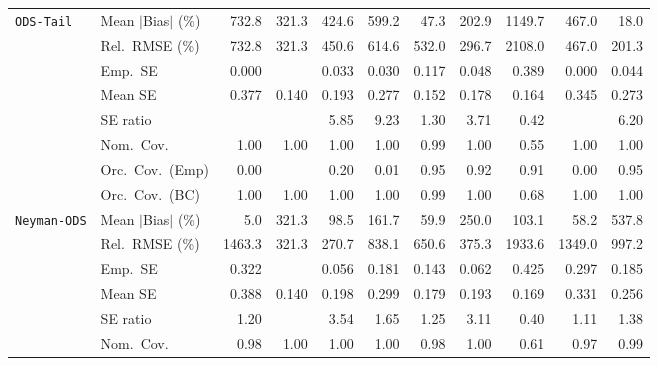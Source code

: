 \begin{landscape}
\begin{longtable}{llrrrrrrrrr}
\addlinespace[2pt]
\quad \texttt{ODS-Tail} & Mean $|$Bias$|$ (\%) & 732.8 & 321.3 & 424.6 & 599.2 & \cellcolor{ranktwo}47.3 & \cellcolor{rankthree}202.9 & 1149.7 & 467.0 & \cellcolor{rankone}18.0 \\
 & Rel.\ RMSE (\%) & 732.8 & \cellcolor{rankthree}321.3 & 450.6 & 614.6 & 532.0 & \cellcolor{ranktwo}296.7 & 2108.0 & 467.0 & \cellcolor{rankone}201.3 \\
 & Emp.\ SE & 0.000 &  & 0.033 & 0.030 & 0.117 & 0.048 & 0.389 & 0.000 & 0.044 \\
 & Mean SE & 0.377 & 0.140 & 0.193 & 0.277 & 0.152 & 0.178 & 0.164 & 0.345 & 0.273 \\
 & SE ratio &  &  & 5.85 & 9.23 & \cellcolor{rankone}1.30 & \cellcolor{rankthree}3.71 & \cellcolor{ranktwo}0.42 &  & 6.20 \\
 & Nom.\ Cov. & \cellcolor{ranktwo}1.00 & \cellcolor{ranktwo}1.00 & \cellcolor{ranktwo}1.00 & \cellcolor{ranktwo}1.00 & \cellcolor{rankone}0.99 & \cellcolor{ranktwo}1.00 & \cellcolor{rankthree}0.55 & \cellcolor{ranktwo}1.00 & \cellcolor{ranktwo}1.00 \\
 & Orc.\ Cov.\ (Emp) & 0.00 &  & 0.20 & 0.01 & \cellcolor{rankone}0.95 & \cellcolor{ranktwo}0.92 & \cellcolor{rankthree}0.91 & 0.00 & \cellcolor{rankone}0.95 \\
 & Orc.\ Cov.\ (BC) & \cellcolor{ranktwo}1.00 & \cellcolor{ranktwo}1.00 & \cellcolor{ranktwo}1.00 & \cellcolor{ranktwo}1.00 & \cellcolor{rankone}0.99 & \cellcolor{ranktwo}1.00 & \cellcolor{rankthree}0.68 & \cellcolor{ranktwo}1.00 & \cellcolor{ranktwo}1.00 \\
\addlinespace[2pt]
\quad \texttt{Neyman-ODS} & Mean $|$Bias$|$ (\%) & \cellcolor{rankone}5.0 & 321.3 & 98.5 & 161.7 & \cellcolor{rankthree}59.9 & 250.0 & 103.1 & \cellcolor{ranktwo}58.2 & 537.8 \\
 & Rel.\ RMSE (\%) & 1463.3 & \cellcolor{ranktwo}321.3 & \cellcolor{rankone}270.7 & 838.1 & 650.6 & \cellcolor{rankthree}375.3 & 1933.6 & 1349.0 & 997.2 \\
 & Emp.\ SE & 0.322 &  & 0.056 & 0.181 & 0.143 & 0.062 & 0.425 & 0.297 & 0.185 \\
 & Mean SE & 0.388 & 0.140 & 0.198 & 0.299 & 0.179 & 0.193 & 0.169 & 0.331 & 0.256 \\
 & SE ratio & \cellcolor{ranktwo}1.20 &  & 3.54 & 1.65 & \cellcolor{rankthree}1.25 & 3.11 & 0.40 & \cellcolor{rankone}1.11 & 1.38 \\
 & Nom.\ Cov. & \cellcolor{ranktwo}0.98 & 1.00 & 1.00 & 1.00 & \cellcolor{ranktwo}0.98 & 1.00 & 0.61 & \cellcolor{rankone}0.97 & \cellcolor{rankthree}0.99 \\

\end{longtable}
\end{landscape}
